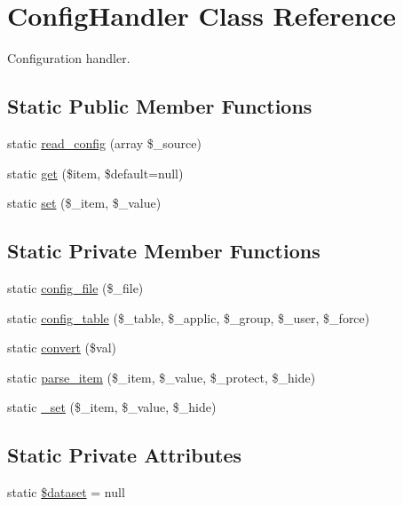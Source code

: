 \section{ConfigHandler Class Reference}
\label{classConfigHandler}


Configuration handler.  


\subsection*{Static Public Member Functions}
\begin{DoxyCompactItemize}
\item 
static \hyperlink{classConfigHandler_aee636634bffead4a620e4e01dd3a9649}{read\_\-config} (array \$\_\-source)
\item 
static \hyperlink{classConfigHandler_aa8f6a7516588561626efccb8be5875ce}{get} (\$item, \$default=null)
\item 
static \hyperlink{classConfigHandler_a0f6d68b5d2f4da014209d449fc0f5996}{set} (\$\_\-item, \$\_\-value)
\end{DoxyCompactItemize}
\subsection*{Static Private Member Functions}
\begin{DoxyCompactItemize}
\item 
static \hyperlink{classConfigHandler_a1a9cec0c104e79c5b70eaee3c1f8eaea}{config\_\-file} (\$\_\-file)
\item 
static \hyperlink{classConfigHandler_a07cc4e8a46e645f52c0bfb50baca1184}{config\_\-table} (\$\_\-table, \$\_\-applic, \$\_\-group, \$\_\-user, \$\_\-force)
\item 
static \hyperlink{classConfigHandler_a9851c66d75db6a65c64aba5192173c14}{convert} (\$val)
\item 
static \hyperlink{classConfigHandler_a68fb5e0d30a583d249ae6b407450123d}{parse\_\-item} (\$\_\-item, \$\_\-value, \$\_\-protect, \$\_\-hide)
\item 
static \hyperlink{classConfigHandler_a7a31419ae991ab50967444568277aa4c}{\_\-set} (\$\_\-item, \$\_\-value, \$\_\-hide)
\end{DoxyCompactItemize}
\subsection*{Static Private Attributes}
\begin{DoxyCompactItemize}
\item 
static \hyperlink{classConfigHandler_a271a119ca51e0d3da5b8bc2238fc569a}{\$dataset} = null
\end{DoxyCompactItemize}


